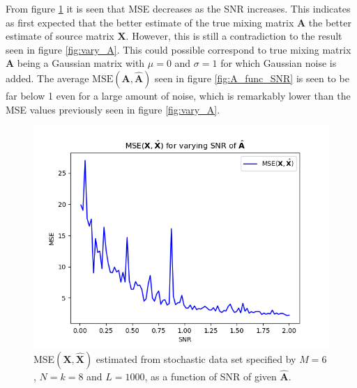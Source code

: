 From figure \ref{fig:X_func_SNR} it is seen that MSE decreases as the SNR increases. 
This indicates as first expected that the better estimate of the true mixing matrix $\mathbf{A}$ the better estimate of source matrix $\mathbf{X}$. 
However, this is still a contradiction to the result seen in figure \ref{fig:vary_A}. 
This could possible correspond to true mixing matrix $\mathbf{A}$ being a Gaussian matrix with $\mu = 0$ and $\sigma = 1$ for which Gaussian noise is added. 
The average $\text{MSE}(\mathbf{A}, \hat{\mathbf{A}})$ seen in figure \ref{fig:A_func_SNR} is seen to be far below 1 even for a large amount of noise, which is remarkably lower than the MSE values previously seen in figure \ref{fig:vary_A}.  
\begin{figure}[H]
\begin{widepage}
    \begin{minipage}[t]{.45\textwidth}
    	\centering
		\includegraphics[scale=0.5]{figures/ch_6/X_func_SNR.png}
		\caption{MSE$(\mathbf{X},\hat{\mathbf{X}})$ estimated from stochastic data set specified by $M = 6$, $N = k = 8$ and $L = 1000$, as a function of SNR of given $\hat{\mathbf{A}}$.}
		\label{fig:X_func_SNR}
    \end{minipage} 
    \hspace{0.5cm}
    \begin{minipage}[t]{.45\textwidth}
        \centering

\end{minipage}
\end{widepage}
\end{figure}
